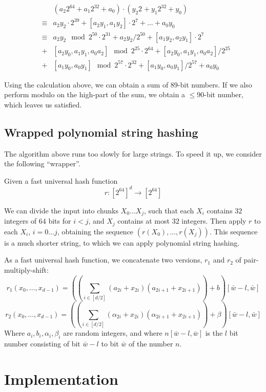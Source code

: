 \documentclass[]{article}
\begin{document}
\[\begin{matrix}
& & (a_2 2^{64} + a_1 2^{32} + a_0)\cdot (y_2 2^{} + y_1 2^{32} + y_0) \\
& \equiv & a_2 y_2 \cdot 2^{39} + [a_2 y_1,a_1 y_2] \cdot 2^7 + \ldots + a_0 y_0  \\
& \equiv & a_2 y_2 \mod 2^{50} \cdot 2^{31} + a_2 y_2 / 2^{50} + [a_1 y_2, a_2 y_1] \cdot 2^7 \\
& + & [a_2 y_0, a_1 y_1, a_0 a_2] \mod 2^{25} \cdot 2^{64} + [a_2 y_0, a_1 y_1, a_0 a_2] /2^{25} \\
& + & [a_1 y_0, a_0 y_1] \mod 2^{57} \cdot 2^{32} + [a_1 y_0, a_0 y_1] /2^{57} + a_0 y_0
\end{matrix}
\]

Using the calculation above, we can obtain a sum of $89$-bit numbers. If we also perform modulo on the high-part of the sum, we obtain a $\le 90$-bit number, which leaves us satisfied.

\subsection*{Wrapped polynomial string hashing}

The algorithm above runs too slowly for large strings. To speed it up, we consider the following ``wrapper''. 

Given a fast universal hash function
\[r : [2^{64}]^d \to [2^{64}] \]

We can divide the input into chunks $X_0 \ldots X_j$, such that each $X_i$ contains $32$ integers of $64$ bits for $i<j$, and $X_j$ contains at most $32$ integers. Then apply $r$ to each $X_i$, $i=0\ldots j$, obtaining the sequence $\left(r(X_0), \ldots , r(X_j)\right)$. This sequence is a much shorter string, to which we can apply polynomial string hashing.

As a fast universal hash function, we concatenate two versions, $r_1$ and $r_2$ of pair-multiply-shift:
\[r_1(x_0,\ldots ,x_{d-1}) = \left(\left(\sum_{i\in [d/2]}(a_{2i} + x_{2i})(a_{2i+1} + x_{2i+1}) \right)+b \right) [\bar{w}-l,\bar{w}]\]
\[r_2(x_0,\ldots ,x_{d-1}) = \left(\left(\sum_{i\in [d/2]}(\alpha_{2i} + x_{2i})(\alpha_{2i+1} + x_{2i+1}) \right)+\beta \right) [\bar{w}-l,\bar{w}]\]
Where $a_i,b_i,\alpha_i,\beta_i$ are random integers, and where $n[\bar{w}-l,\bar{w}]$ is the $l$ bit number consisting of bit $\bar{w}-l$ to bit $\bar{w}$ of the number $n$.

\section{Implementation}
\end{document}
